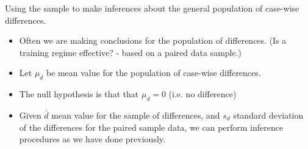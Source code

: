 \documentclass[a4paper,12pt]{article}
\begin{document}
Using the sample to make inferences about the general population of case-wise differences.
\begin{itemize}
\item Often we are making conclusions for the population of differences. (Is a training regime effective? - based on a paired data sample.)
\item Let $\mu_d$ be mean value for the population of case-wise differences.
\item The null hypothesis is that that $\mu_d = 0$ (i.e. no difference)
\item Given $\bar{d}$ mean value for the sample of differences, and $s_d$ standard deviation of the differences for the paired sample data, we can perform inference procedures as we have done previously.
\end{itemize}
\end{document}
